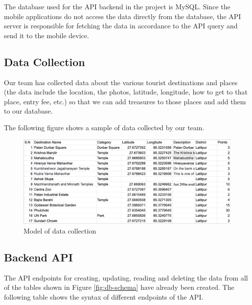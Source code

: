 \documentclass[12pt, a4paper, oneside]{article}
\begin{document}
The database used for the API backend in the project is MySQL. Since the mobile applications do not access the data directly from the database, the API server is responsible for fetching the data in accordance to the API query and send it to the mobile device. 

\subsection{Data Collection}
Our team has collected data about the various tourist destinations and places (the data include the location, the photos, latitude, longitude, how to get to that place, entry fee, etc.) so that we can add treasures to those places and add them to our database.

The following figure shows a sample of data collected by our team.


\begin{figure}[H]
\includegraphics[width=\linewidth, keepaspectratio]{screenshots/data-collection.png}
\centering
\caption{Model of data collection}
\label{fig:data-model}
\end{figure}


\subsection{Backend API}
The API endpoints for creating, updating, reading and deleting the data from all of the tables shown in Figure \ref{fig:db-schema} have already been created. The following table shows the syntax of different endpoints of the API.
\end{document}
